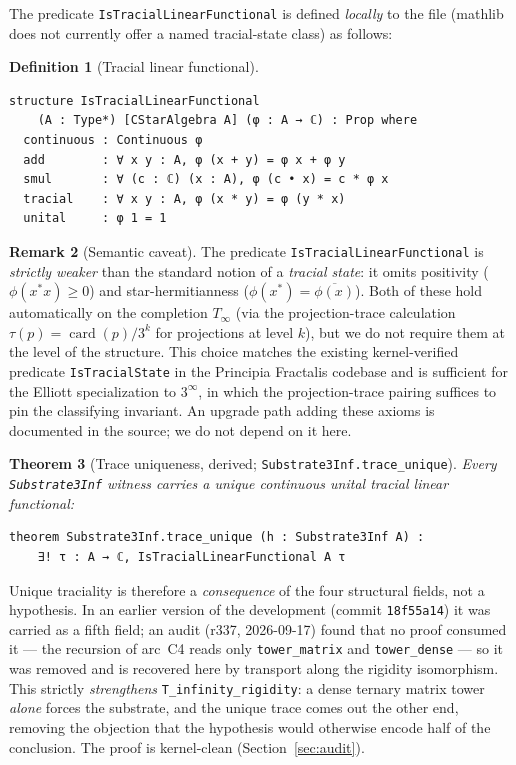 \documentclass[11pt,a4paper]{article}
\theoremstyle{plain}
\newtheorem{theorem}{Theorem}[section]
\theoremstyle{definition}
\newtheorem{definition}[theorem]{Definition}
\newtheorem{remark}[theorem]{Remark}
\begin{document}
The predicate \texttt{IsTracialLinearFunctional} is defined \emph{locally} to the file (mathlib does not currently offer a named tracial-state class) as follows:

\begin{definition}[Tracial linear functional]
\label{def:tracial-linear}
\begin{lstlisting}
structure IsTracialLinearFunctional
    (A : Type*) [CStarAlgebra A] (φ : A → ℂ) : Prop where
  continuous : Continuous φ
  add        : ∀ x y : A, φ (x + y) = φ x + φ y
  smul       : ∀ (c : ℂ) (x : A), φ (c • x) = c * φ x
  tracial    : ∀ x y : A, φ (x * y) = φ (y * x)
  unital     : φ 1 = 1
\end{lstlisting}
\end{definition}

\begin{remark}[Semantic caveat]
\label{rem:tracial-caveat}
The predicate \texttt{IsTracialLinearFunctional} is \emph{strictly weaker} than the standard notion of a \emph{tracial state}: it omits positivity ($\phi(x^{\ast} x) \geq 0$) and star-hermitianness ($\phi(x^{\ast}) = \overline{\phi(x)}$). Both of these hold automatically on the completion $T_{\infty}$ (via the projection-trace calculation $\tau(p) = \operatorname{card}(p)/3^k$ for projections at level $k$), but we do not require them at the level of the structure. This choice matches the existing kernel-verified predicate \texttt{IsTracialState} in the Principia Fractalis codebase and is sufficient for the Elliott specialization to $3^{\infty}$, in which the projection-trace pairing suffices to pin the classifying invariant. An upgrade path adding these axioms is documented in the source; we do not depend on it here.
\end{remark}

\begin{theorem}[Trace uniqueness, derived; \texttt{Substrate3Inf.trace\_unique}]
\label{thm:trace-unique}
Every \texttt{Substrate3Inf} witness carries a \emph{unique} continuous unital tracial linear functional:
\begin{lstlisting}
theorem Substrate3Inf.trace_unique (h : Substrate3Inf A) :
    ∃! τ : A → ℂ, IsTracialLinearFunctional A τ
\end{lstlisting}
\end{theorem}

\noindent
Unique traciality is therefore a \emph{consequence} of the four structural fields, not a hypothesis. In an earlier version of the development (commit \texttt{18f55a14}) it was carried as a fifth field; an audit (r337, 2026-09-17) found that no proof consumed it --- the recursion of arc~C4 reads only \texttt{tower\_matrix} and \texttt{tower\_dense} --- so it was removed and is recovered here by transport along the rigidity isomorphism. This strictly \emph{strengthens} \texttt{T\_infinity\_rigidity}: a dense ternary matrix tower \emph{alone} forces the substrate, and the unique trace comes out the other end, removing the objection that the hypothesis would otherwise encode half of the conclusion. The proof is kernel-clean (Section~\ref{sec:audit}).
\end{document}
